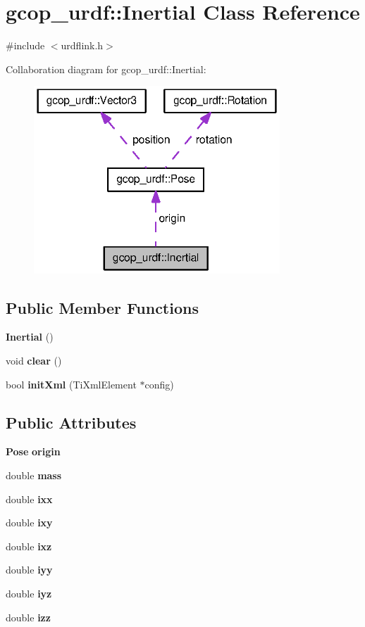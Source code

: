 \section{gcop\-\_\-urdf\-:\-:\-Inertial \-Class \-Reference}
\label{classgcop__urdf_1_1Inertial}


{\ttfamily \#include $<$urdflink.\-h$>$}



\-Collaboration diagram for gcop\-\_\-urdf\-:\-:\-Inertial\-:\nopagebreak
\begin{figure}[H]
\begin{center}
\leavevmode
\includegraphics[width=262pt]{classgcop__urdf_1_1Inertial__coll__graph}
\end{center}
\end{figure}
\subsection*{\-Public \-Member \-Functions}
\begin{DoxyCompactItemize}
\item 
{\bf \-Inertial} ()
\item 
void {\bf clear} ()
\item 
bool {\bf init\-Xml} (\-Ti\-Xml\-Element $\ast$config)
\end{DoxyCompactItemize}
\subsection*{\-Public \-Attributes}
\begin{DoxyCompactItemize}
\item 
{\bf \-Pose} {\bf origin}
\item 
double {\bf mass}
\item 
double {\bf ixx}
\item 
double {\bf ixy}
\item 
double {\bf ixz}
\item 
double {\bf iyy}
\item 
double {\bf iyz}
\item 
double {\bf izz}
\end{DoxyCompactItemize}


